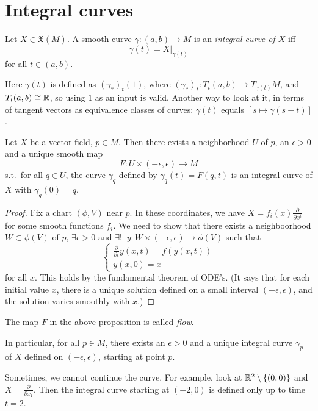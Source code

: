 \section{Integral curves}
\begin{definition}
    Let $X \in \mathfrak{X}(M)$. A smooth curve 
    $\gamma: (a, b) \to  M$ is an  \emph{integral curve of $X$} iff $$\dot \gamma(t) = X|_{\gamma(t)}$$ for all $t \in (a, b)$.
\end{definition}
\begin{remark}
    Here $\dot \gamma(t)$ is defined as  $(\gamma_*)_t(1)$, where $(\gamma_*)_t : T_t(a, b) \to  T_{\gamma(t)} M$, and $T_t(a, b) \cong \mathbb{R}$, so using $1$ as an input is valid.
    Another way to look at it, in terms of tangent vectors as equivalence classes of curves: $\dot \gamma(t)$ equals $[s \mapsto  \gamma(s+t)]$.
\end{remark}
\begin{prop}
    Let $X $ be a vector field, $p \in M$.
    Then there exists a neighborhood $U$ of $p$, an $\epsilon>0$ and a unique smooth map $$F: U \times (-\epsilon, \epsilon) \to  M$$ s.t.\ for all $q \in U$,  the curve
    $\gamma_q$ defined by $\gamma_q(t)=F(q,t)$ is an  integral curve of $X$ with  $\gamma_q(0) = q$.
\end{prop}
\begin{proof}
    Fix a chart $(\phi, V)$ near $p$. In these coordinates, we have $X = f_i(x) \frac{\partial }{\partial x^i}$ for some smooth functions $f_i$.
    We need to show that there exists a neighboorhood $W \subset \phi(V)$ of $p$, $\exists  \epsilon >0$ and $\exists !\;\; y: W \times (-\epsilon, \epsilon) \to  \phi(V)$ such that 
    $$\begin{cases}
     \frac{\partial }{\partial t} y(x, t) = f(y(x, t))\\
     y(x, 0) = x
    \end{cases}$$
for all $x$.
    This holds by the fundamental theorem of ODE's.
 (It  says that for each initial value $x$, there is a unique solution defined on a small interval $(-\epsilon, \epsilon)$, and the solution varies smoothly with $x$.)
\end{proof}
\begin{remark}
    The map $F$ in the above proposition is called \emph{flow}.
\end{remark}
\begin{remark}
In particular, for all $p \in M$, there exists an $\epsilon> 0$ and a unique integral curve $\gamma_p$ of $X$ defined on $(-\epsilon, \epsilon)$, starting at point $p$.
\end{remark}
\begin{eg}
    Sometimes, we cannot continue the curve. For example, look at $\mathbb{R}^2\setminus\{(0,0)\}$ and $X = \frac{\partial }{\partial x_1}$. Then the integral curve starting at $(-2, 0)$ is defined only up to time $t=2$.
\end{eg}





